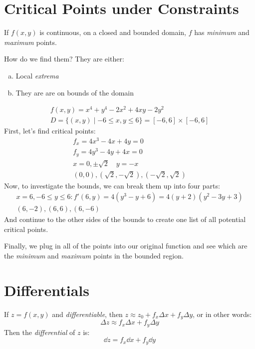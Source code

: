\documentclass[00_complete]{subfiles}
\begin{document}
\section{Critical Points under Constraints}
\begin{theorem}
    If $f(x,y)$ is continuous, on a closed and bounded domain, $f$ has
    \emph{minimum} and \emph{maximum} points.
\end{theorem}
How do we find them? They are either:
\begin{enumerate}[a.] \tightlist
    \item Local \emph{extrema}
    \item They are are on bounds of the domain
\end{enumerate}
\begin{example}
    \begin{gather*}
        f(x,y)=x^4+y^4-2x^2+4xy-2y^2 \\
        D =\{(x,y)\mid -6 \leq x,y \leq 6\} =[-6,6]\times[-6,6]
    \end{gather*}
    First, let's find critical points:
    \begin{gather*}
        f_x=4x^3-4x+4y = 0 \\
        f_y=4y^3-4y+4x = 0 \\
        x=0,\pm\sqrt 2 \quad y=-x \\
        (0,0), (\sqrt 2, -\sqrt 2),(-\sqrt 2, \sqrt 2)
    \end{gather*}
    Now, to investigate the bounds, we can break them up into four parts:
    \begin{gather*}
        x=6, -6 \leq y \leq 6: f'(6,y)=4(y^3-y+6)=4(y+2)(y^2-3y+3) \\
        (6,-2),(6,6),(6,-6)
    \end{gather*}
    And continue to the other sides of the bounds to create one list of all
    potential critical points.

    Finally, we plug in all of the points into our original function and see
    which are the \emph{minimum} and \emph{maximum} points in the bounded region.
\end{example}

\section{Differentials}
\begin{reminder}
    If $z=f(x,y)$ and \emph{differentiable}, then $z\approx z_0+f_x\Delta
    x+f_y\Delta y$, or in other words:
    $$\Delta z \approx f_x \Delta x + f_y \Delta y$$
    Then the \emph{differential} of $z$ is:
    $$\boxed{\dd{z}=f_x\dd{x}+f_y\dd{y}}$$
\end{reminder}
\end{document}
